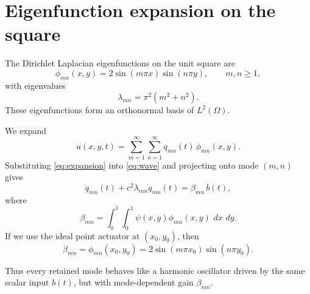 \documentclass[11pt]{article}
\newcommand{\dd}{\,d}
\begin{document}
\section{Eigenfunction expansion on the square}
The Dirichlet Laplacian eigenfunctions on the unit square are
\begin{equation}
\label{eq:eigs}
\phi_{mn}(x,y)=2\sin(m\pi x)\sin(n\pi y),\qquad m,n\ge 1,
\end{equation}
with eigenvalues
\begin{equation}
\label{eq:eigvals}
\lambda_{mn}=\pi^2(m^2+n^2).
\end{equation}
These eigenfunctions form an orthonormal basis of $L^2(\Omega)$.

We expand
\begin{equation}
\label{eq:expansion}
 u(x,y,t)=\sum_{m=1}^{\infty}\sum_{n=1}^{\infty} q_{mn}(t)\,\phi_{mn}(x,y).
\end{equation}
Substituting \eqref{eq:expansion} into \eqref{eq:wave} and projecting 
onto mode $(m,n)$ gives
\begin{equation}
\label{eq:modalode}
 \ddot q_{mn}(t) + c^2\lambda_{mn} q_{mn}(t) = \beta_{mn}\, b(t),
\end{equation}
where
\begin{equation}
\label{eq:beta-general}
\beta_{mn}=\int_0^1\!\int_0^1 \psi(x,y)\phi_{mn}(x,y)\,\dd x\,\dd y.
\end{equation}
If we use the ideal point actuator at $(x_0,y_0)$, then
\begin{equation}
\label{eq:beta-point}
\beta_{mn}=\phi_{mn}(x_0,y_0)=2\sin(m\pi x_0)\sin(n\pi y_0).
\end{equation}

Thus every retained mode behaves like a harmonic oscillator driven by 
the same scalar input $b(t)$, but with mode-dependent gain $\beta_{mn}$.
\end{document}
